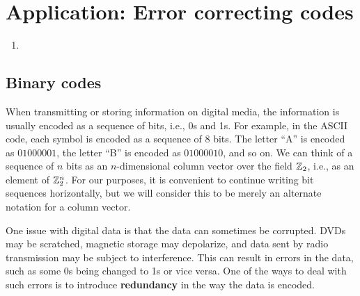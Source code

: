 \section{Application: Error correcting codes}

\begin{outcome}
  \begin{enumerate}
  \item
  \end{enumerate}
\end{outcome}

\subsection*{Binary codes}

When transmitting or storing information on digital media, the
information is usually encoded as a sequence of bits, i.e., 0s and 1s.
For example, in the ASCII code, each symbol is encoded as a sequence
of 8 bits. The letter ``A'' is encoded as $01000001$, the letter ``B''
is encoded as $01000010$, and so on. We can think of a sequence of $n$
bits as an $n$-dimensional column vector over the field $\mathbb{Z}_2$, i.e.,
as an element of $\mathbb{Z}_2^n$. For our purposes, it is convenient to
continue writing bit sequences horizontally, but we will consider this
to be merely an alternate notation for a column vector.

One issue with digital data is that the data can sometimes be
corrupted. DVDs may be scratched, magnetic storage may depolarize, and
data sent by radio transmission may be subject to interference. This
can result in errors in the data, such as some 0s being changed to 1s
or vice versa. One of the ways to deal with such errors is to
introduce \textbf{redundancy}%
 in the way the data is encoded.

